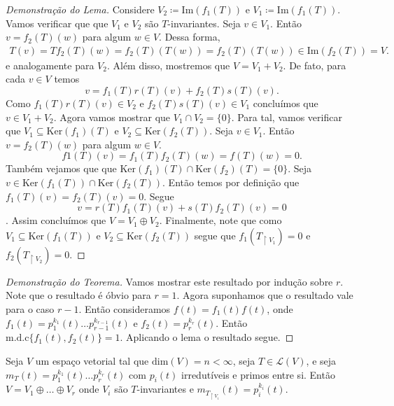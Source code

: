 \documentclass[11pt,twoside,a4paper]{book}
\begin{document}
\begin{proof}[Demonstração do Lema]
  Considere \(V_2\coloneqq\text{Im}(f_1(T))\)
  e \(V_1\coloneqq\text{Im}(f_1(T))\).
  Vamos verificar que que \(V_1\) e \(V_2\) são \(T\)-invariantes.
  Seja \(v\in V_1\). Então \(v=f_2(T)(w)\) para algum \(w\in V\).
  Dessa forma,
  \begin{align*}
    T(v) = T f_2(T)(w)=f_2(T)(T(w))=f_2(T)(T(w))\in\text{Im}(f_2(T))=V.
  \end{align*}
  e analogamente para \(V_2\). Além disso, mostremos que \(V=V_1+V_2\).
  De fato, para cada \(v\in V\) temos \[v=f_1(T)r(T)(v)+f_2(T)s(T)(v).\]
  Como \(f_1(T)r(T)(v)\in V_2\) e \(f_2(T)s(T)(v)\in V_1\)
  concluímos que \(v\in V_1 + V_2\). Agora vamos mostrar que \(V_1\cap
  V_2=\{0\}\). Para tal, vamos verificar que
  \(V_1\subseteq\text{Ker}(f_1)(T)\)
  e \(V_2\subseteq\text{Ker}(f_2(T)).\) Seja \(v\in V_1\). Então
  \(v=f_2(T)(w)\) para algum \(w\in V\).
  \[f1(T)(v)=f_1(T)f_2(T)(w)=f(T)(w)=0.\]
  Também vejamos que que
  \(\text{Ker}(f_1)(T)\cap\text{Ker}(f_2)(T)=\{0\}\). Seja
  \(v\in\text{Ker}(f_1(T))\cap\text{Ker}(f_2(T))\).
  Então temos por definição que \(f_1(T)(v)=f_2(T)(v)=0\). Segue
  \[v=r(T)f_1(T)(v)+s(T)f_2(T)(v)=0\]. Assim concluímos que \(V=V_1\oplus
  V_2\). Finalmente, note que como \(V_1\subseteq\text{Ker}(f_1(T))\) e
  \(V_2\subseteq\text{Ker}(f_2(T))\) segue que  \(f_1(T_{\upharpoonright V_1})=0\) e \(f_2(T_{\upharpoonright V_2})=0\).
\end{proof}
\begin{proof}[Demonstração do Teorema]
Vamos mostrar este resultado por indução sobre \(r\). Note que o resultado é
óbvio para \(r=1\). Agora suponhamos que o resultado vale para
o caso \(r-1\). Então consideramos \(f(t)=f_1(t)f(t)\),
onde \(f_1(t)=p_1^{k_1}(t)\ldots p_{r-1}^{k_{r-1}}(t)\) e \(f_2(t)=p_r^{k_r}(t)\).
Então \(\text{m.d.c}\{f_1(t),f_2(t)\}=1\).
Aplicando o lema o resultado segue.
\end{proof}
\begin{corolario}
  Seja \(V\) um espaço vetorial tal que \(\text{dim}(V)=n < \infty\),
  seja \(T\in\mathcal{L}(V)\), e seja
  \(m_T(t)=p_1^{k_1}(t)\ldots p_r^{k_r}(t) \) com \(p_i(t)\) irredutíveis e
  primos entre si. Então \(V=V_1\oplus\ldots\oplus V_r\) onde \(V_i\)
  são \(T\)-invariantes e \(m_{T_{\upharpoonright V_i}}(t)=p_i^{k_i}(t)\). 
 \end{corolario}
\end{document}
